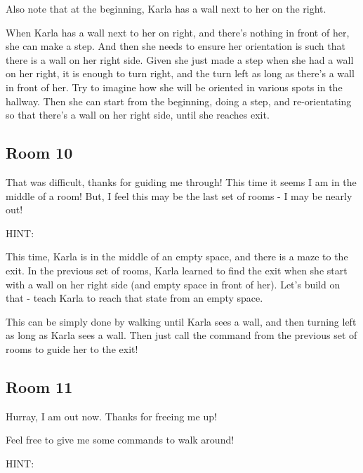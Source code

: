 Also note that at the beginning, Karla has a wall next to her on the right.

When Karla has a wall next to her on right, and there's nothing in front of her, she can make a step. And then she needs to ensure her orientation is such that there is a wall on her right side. Given she just made a step when she had a wall on her right, it is enough to turn right, and the turn left as long as there's a wall in front of her. Try to imagine how she will be oriented in various spots in the hallway. Then she can start from the beginning, doing a step, and re-orientating so that there's a wall on her right side, until she reaches exit.

\subsection{Room 10}

That was difficult, thanks for guiding me through! This time it seems I am in the middle of a room! But, I feel this may be the last set of rooms - I may be nearly out!

HINT:

This time, Karla is in the middle of an empty space, and there is a maze to the exit. In the previous set of rooms, Karla learned to find the exit when she start with a wall on her right side (and empty space in front of her). Let's build on that - teach Karla to reach that state from an empty space.

This can be simply done by walking until Karla sees a wall, and then turning left as long as Karla sees a wall. Then just call the command from the previous set of rooms to guide her to the exit!

\subsection{Room 11}

Hurray, I am out now. Thanks for freeing me up!

Feel free to give me some commands to walk around!

HINT:
